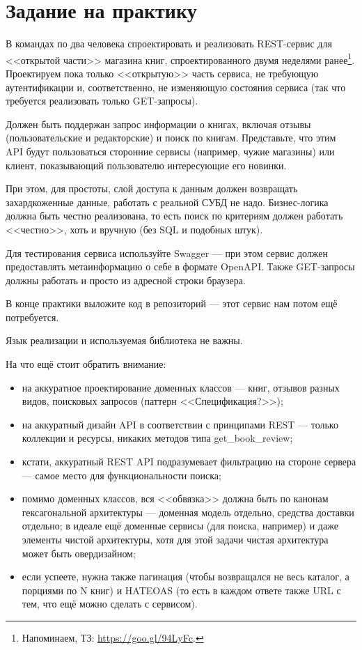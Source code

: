 \documentclass{../../text-style}
\begin{document}
\maketitle
\thispagestyle{empty}

\section{Задание на практику}

В командах по два человека спроектировать и реализовать REST-сервис для <<открытой части>> магазина книг, спроектированного двумя неделями ранее\footnote{Напоминаем, ТЗ: \url{https://goo.gl/94LyFc}.}. Проектируем пока только <<открытую>> часть сервиса, не требующую аутентификации и, соответственно, не изменяющую состояния сервиса (так что требуется реализовать только GET-запросы).

Должен быть поддержан запрос информации о книгах, включая отзывы (пользовательские и редакторские) и поиск по книгам. Представьте, что этим API будут пользоваться сторонние сервисы (например, чужие магазины) или клиент, показывающий пользователю интересующие его новинки.

При этом, для простоты, слой доступа к данным должен возвращать захардкоженные данные, работать с реальной СУБД не надо. Бизнес-логика должна быть честно реализована, то есть поиск по критериям должен работать <<честно>>, хоть и вручную (без SQL и подобных штук).

Для тестирования сервиса используйте Swagger --- при этом сервис должен предоставлять метаинформацию о себе в формате OpenAPI. Также GET-запросы должны работать и просто из адресной строки браузера.

В конце практики выложите код в репозиторий --- этот сервис нам потом ещё потребуется.

Язык реализации и используемая библиотека не важны.

На что ещё стоит обратить внимание:

\begin{itemize}
    \item на аккуратное проектирование доменных классов --- книг, отзывов разных видов, поисковых запросов (паттерн <<Спецификация?>>);
    \item на аккуратный дизайн API в соответствии с принципами REST --- только коллекции и ресурсы, никаких методов типа get\_book\_review;
    \item кстати, аккуратный REST API подразумевает фильтрацию на стороне сервера --- самое место для функциональности поиска;
    \item помимо доменных классов, вся <<обвязка>> должна быть по канонам гексагональной архитектуры --- доменная модель отдельно, средства доставки отдельно; в идеале ещё доменные сервисы (для поиска, например) и даже элементы чистой архитектуры, хотя для этой задачи чистая архитектура может быть овердизайном;
    \item если успеете, нужна также пагинация (чтобы возвращался не весь каталог, а порциями по N книг) и HATEOAS (то есть в каждом ответе также URL с тем, что ещё можно сделать с сервисом).
\end{itemize}
\end{document}
